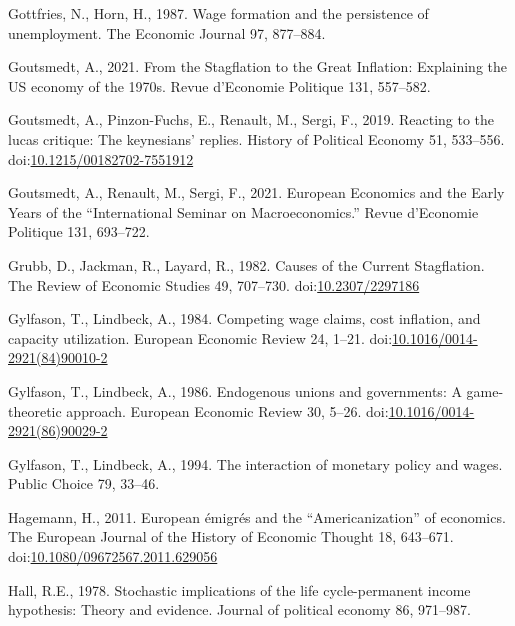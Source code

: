 \documentclass[
  12pt,
  onecolumn]{article}
\newlength{\cslhangindent}
\newlength{\cslentryspacingunit} %
\newenvironment{CSLReferences}[2] %
 {%
  \setlength{\parindent}{0pt}
  \ifodd #1
  \let\oldpar\par
  \def\par{\hangindent=\cslhangindent\oldpar}
  \fi
  \setlength{\parskip}{#2\cslentryspacingunit}
 }%
 {}
\begin{document}
\begin{CSLReferences}{1}{0}
\leavevmode{}%
Gottfries, N., Horn, H., 1987. Wage formation and the persistence of
unemployment. The Economic Journal 97, 877--884.

\leavevmode{}%
Goutsmedt, A., 2021. From the {Stagflation} to the {Great Inflation}:
{Explaining} the {US} economy of the 1970s. Revue d'Economie Politique
131, 557--582.

\leavevmode{}%
Goutsmedt, A., Pinzon-Fuchs, E., Renault, M., Sergi, F., 2019. Reacting
to the lucas critique: {The} keynesians' replies. History of Political
Economy 51, 533--556.
doi:\href{https://doi.org/10.1215/00182702-7551912}{10.1215/00182702-7551912}

\leavevmode{}%
Goutsmedt, A., Renault, M., Sergi, F., 2021. European {Economics} and
the {Early Years} of the {``{International Seminar} on
{Macroeconomics}.''} Revue d'Economie Politique 131, 693--722.

\leavevmode{}%
Grubb, D., Jackman, R., Layard, R., 1982. Causes of the {Current
Stagflation}. The Review of Economic Studies 49, 707--730.
doi:\href{https://doi.org/10.2307/2297186}{10.2307/2297186}

\leavevmode{}%
Gylfason, T., Lindbeck, A., 1984. Competing wage claims, cost inflation,
and capacity utilization. European Economic Review 24, 1--21.
doi:\href{https://doi.org/10.1016/0014-2921(84)90010-2}{10.1016/0014-2921(84)90010-2}

\leavevmode{}%
Gylfason, T., Lindbeck, A., 1986. Endogenous unions and governments: {A}
game-theoretic approach. European Economic Review 30, 5--26.
doi:\href{https://doi.org/10.1016/0014-2921(86)90029-2}{10.1016/0014-2921(86)90029-2}

\leavevmode{}%
Gylfason, T., Lindbeck, A., 1994. The interaction of monetary policy and
wages. Public Choice 79, 33--46.

\leavevmode{}%
Hagemann, H., 2011. European émigrés and the {``{Americanization}''} of
economics. The European Journal of the History of Economic Thought 18,
643--671.
doi:\href{https://doi.org/10.1080/09672567.2011.629056}{10.1080/09672567.2011.629056}

\leavevmode{}%
Hall, R.E., 1978. Stochastic implications of the life cycle-permanent
income hypothesis: Theory and evidence. Journal of political economy 86,
971--987.


\end{CSLReferences}
\end{document}
